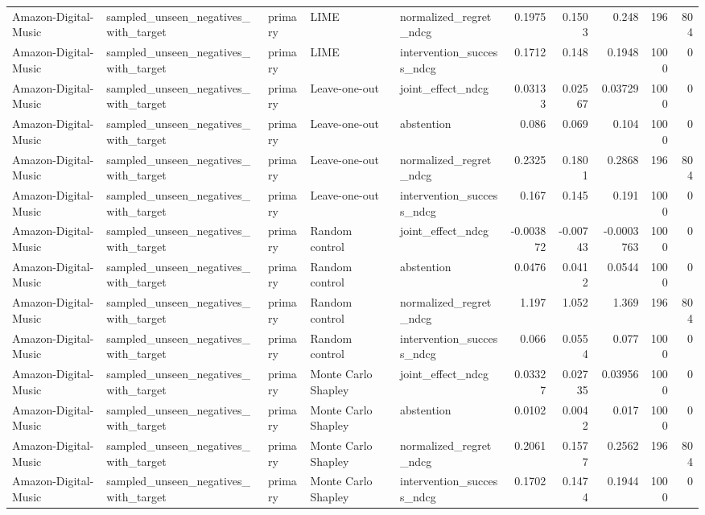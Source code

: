 \begin{table}[t]
{\begin{tabular}{lllllrrrrr}
Amazon-Digital-Music & sampled\_unseen\_negatives\_with\_target & primary & LIME & normalized\_regret\_ndcg & 0.1975 & 0.1503 & 0.248 & 196 & 804 \\
Amazon-Digital-Music & sampled\_unseen\_negatives\_with\_target & primary & LIME & intervention\_success\_ndcg & 0.1712 & 0.148 & 0.1948 & 1000 & 0 \\
Amazon-Digital-Music & sampled\_unseen\_negatives\_with\_target & primary & Leave-one-out & joint\_effect\_ndcg & 0.03133 & 0.02567 & 0.03729 & 1000 & 0 \\
Amazon-Digital-Music & sampled\_unseen\_negatives\_with\_target & primary & Leave-one-out & abstention & 0.086 & 0.069 & 0.104 & 1000 & 0 \\
Amazon-Digital-Music & sampled\_unseen\_negatives\_with\_target & primary & Leave-one-out & normalized\_regret\_ndcg & 0.2325 & 0.1801 & 0.2868 & 196 & 804 \\
Amazon-Digital-Music & sampled\_unseen\_negatives\_with\_target & primary & Leave-one-out & intervention\_success\_ndcg & 0.167 & 0.145 & 0.191 & 1000 & 0 \\
Amazon-Digital-Music & sampled\_unseen\_negatives\_with\_target & primary & Random control & joint\_effect\_ndcg & -0.003872 & -0.00743 & -0.0003763 & 1000 & 0 \\
Amazon-Digital-Music & sampled\_unseen\_negatives\_with\_target & primary & Random control & abstention & 0.0476 & 0.0412 & 0.0544 & 1000 & 0 \\
Amazon-Digital-Music & sampled\_unseen\_negatives\_with\_target & primary & Random control & normalized\_regret\_ndcg & 1.197 & 1.052 & 1.369 & 196 & 804 \\
Amazon-Digital-Music & sampled\_unseen\_negatives\_with\_target & primary & Random control & intervention\_success\_ndcg & 0.066 & 0.0554 & 0.077 & 1000 & 0 \\
Amazon-Digital-Music & sampled\_unseen\_negatives\_with\_target & primary & Monte Carlo Shapley & joint\_effect\_ndcg & 0.03327 & 0.02735 & 0.03956 & 1000 & 0 \\
Amazon-Digital-Music & sampled\_unseen\_negatives\_with\_target & primary & Monte Carlo Shapley & abstention & 0.0102 & 0.0042 & 0.017 & 1000 & 0 \\
Amazon-Digital-Music & sampled\_unseen\_negatives\_with\_target & primary & Monte Carlo Shapley & normalized\_regret\_ndcg & 0.2061 & 0.1577 & 0.2562 & 196 & 804 \\
Amazon-Digital-Music & sampled\_unseen\_negatives\_with\_target & primary & Monte Carlo Shapley & intervention\_success\_ndcg & 0.1702 & 0.1474 & 0.1944 & 1000 & 0 \\

\end{tabular}}
\end{table}
